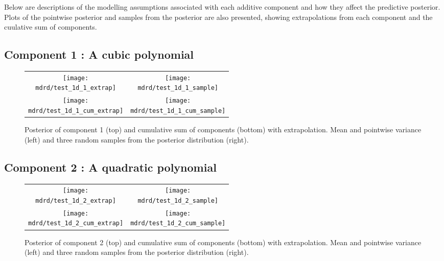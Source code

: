 \documentclass{article} %
\begin{document}
Below are descriptions of the modelling assumptions associated with each additive component and how they affect the predictive posterior.
Plots of the pointwise posterior and samples from the posterior are also presented, showing extrapolations from each component and the cuulative sum of components.

\subsection{Component 1 : A cubic polynomial}



\begin{figure}[H]
\newcommand{\wmgd}{0.5\columnwidth}
\newcommand{\hmgd}{3.0cm}
\newcommand{\mdrd}{test_1d}
\newcommand{\mbm}{\hspace{-0.3cm}}
\begin{tabular}{cc}
\mbm \texttt{[image: \\mdrd/test\_1d\_1\_extrap]} & \texttt{[image: \\mdrd/test\_1d\_1\_sample]} \\
\mbm \texttt{[image: \\mdrd/test\_1d\_1\_cum\_extrap]} & \texttt{[image: \\mdrd/test\_1d\_1\_cum\_sample]}
\end{tabular}
\caption{Posterior of component 1 (top) and cumulative sum of components (bottom) with extrapolation. Mean and pointwise variance (left) and three random samples from the posterior distribution (right).}
\label{fig:extrap1}
\end{figure}

\subsection{Component 2 : A quadratic polynomial}



\begin{figure}[H]
\newcommand{\wmgd}{0.5\columnwidth}
\newcommand{\hmgd}{3.0cm}
\newcommand{\mdrd}{test_1d}
\newcommand{\mbm}{\hspace{-0.3cm}}
\begin{tabular}{cc}
\mbm \texttt{[image: \\mdrd/test\_1d\_2\_extrap]} & \texttt{[image: \\mdrd/test\_1d\_2\_sample]} \\
\mbm \texttt{[image: \\mdrd/test\_1d\_2\_cum\_extrap]} & \texttt{[image: \\mdrd/test\_1d\_2\_cum\_sample]}
\end{tabular}
\caption{Posterior of component 2 (top) and cumulative sum of components (bottom) with extrapolation. Mean and pointwise variance (left) and three random samples from the posterior distribution (right).}
\label{fig:extrap2}
\end{figure}
\end{document}
